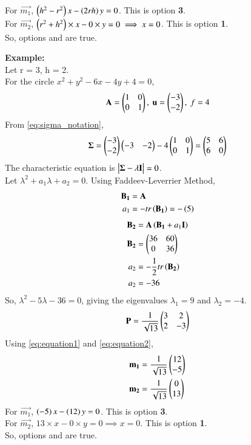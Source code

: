 \documentclass[journal]{IEEEtran}
\begin{document}
For $\vec{m_1}$, $\left(h^2-r^2\right)x - \left(2rh\right)y = 0$. This is option \textbf{3}. \\
For $\vec{m_2}$, $\left(r^2+h^2\right) \times x - 0 \times y = 0 \implies x = 0$. This is option \textbf{1}. \\
So, options \textbf{} and \textbf{} are true.

\textbf{Example:}\\
Let r = 3, h = 2. \\
For the circle $x^2+y^2-6x-4y+4=0$,
\begin{align}
    \mathbf{A} = \begin{pmatrix}1 & 0 \\ 0 & 1\end{pmatrix},\text{ }\mathbf{u} = \begin{pmatrix}-3 \\ -2\end{pmatrix},\text{ }f = 4
\end{align}
From \eqref{eq:sigma_notation},
\begin{align}
    \mathbf{\Sigma} = \begin{pmatrix}-3 \\ -2\end{pmatrix}\begin{pmatrix}-3 & -2\end{pmatrix} - 4\begin{pmatrix}1 & 0 \\ 0 & 1\end{pmatrix} = \begin{pmatrix}5 & 6 \\ 6 & 0\end{pmatrix}
\end{align}
The characteristic equation is $\begin{vmatrix}\mathbf{\Sigma}-\lambda\mathbf{I}\end{vmatrix}=0$. \\
Let $\lambda^2 + a_1 \lambda + a_2 = 0$. Using Faddeev-Leverrier Method,
\begin{align}
    \mathbf{B_1} &= \mathbf{A} \\
    a_1 &= - tr\left(\mathbf{B_1}\right) = -\left(5\right)
\end{align}
\begin{align}
    \mathbf{B_2} &= \mathbf{A}\left(\mathbf{B_1} + a_1\mathbf{I}\right) \\
    \mathbf{B_2} &= \begin{pmatrix}36 & 60 \\ 0 & 36\end{pmatrix} \\
    a_2 &= -\frac{1}{2}tr\left(\mathbf{B_2}\right) \\
    a_2 &= -36
\end{align}
So, $\lambda^2 - 5\lambda - 36 = 0$, giving the eigenvalues $\lambda_1 = 9$ and $\lambda_2 = -4$.
\begin{align}
    \mathbf{P} = \frac{1}{\sqrt{13}}\begin{pmatrix}3 & 2 \\ 2 & -3\end{pmatrix}
\end{align}
Using \eqref{eq:equation1} and \eqref{eq:equation2},
\begin{align}
    \mathbf{m_1} &= \frac{1}{\sqrt{13}}\begin{pmatrix}12 \\ -5\end{pmatrix} \\
    \mathbf{m_2} &= \frac{1}{\sqrt{13}}\begin{pmatrix}0 \\ 13\end{pmatrix}
\end{align}
For $\vec{m_1}$, $\left(-5\right)x - \left(12\right)y = 0$. This is option \textbf{3}. \\
For $\vec{m_2}$, $13 \times x - 0 \times y = 0 \implies x = 0$. This is option \textbf{1}. \\
So, options \textbf{} and \textbf{} are true.
\end{document}
